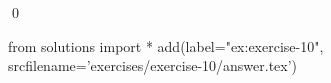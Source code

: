 
\begin{ex} 
  \label{ex:exercise-10}
  
  \qed
\end{ex} 
\begin{python0}
from solutions import *
add(label="ex:exercise-10",
    srcfilename='exercises/exercise-10/answer.tex') 
\end{python0}
